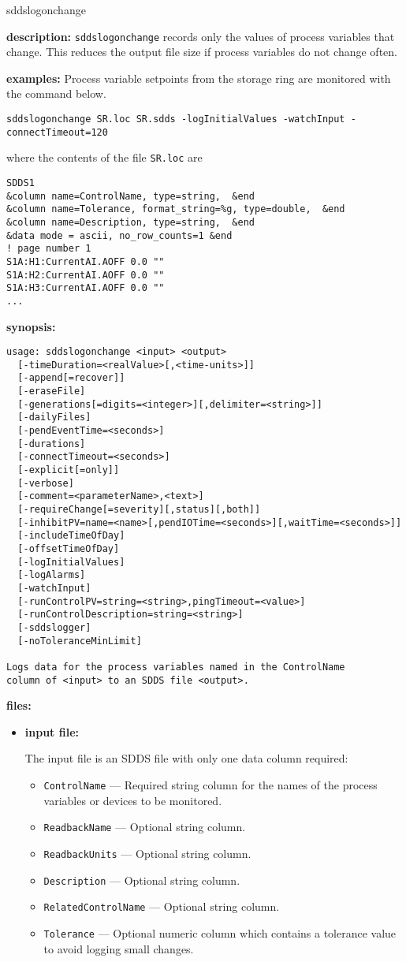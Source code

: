 \begin{sddsprog}{sddslogonchange}
\item \textbf{description:}
\verb+sddslogonchange+ records only the values of process variables that change. This reduces the output file size if process variables do not change often.
\item \textbf{examples:}
Process variable setpoints from the storage ring are monitored
with the command below.
\begin{verbatim}
sddslogonchange SR.loc SR.sdds -logInitialValues -watchInput -connectTimeout=120
\end{verbatim}
where the contents of the file \verb+SR.loc+ are
\begin{verbatim}
SDDS1
&column name=ControlName, type=string,  &end
&column name=Tolerance, format_string=%g, type=double,  &end
&column name=Description, type=string,  &end
&data mode = ascii, no_row_counts=1 &end
! page number 1
S1A:H1:CurrentAI.AOFF 0.0 ""
S1A:H2:CurrentAI.AOFF 0.0 ""
S1A:H3:CurrentAI.AOFF 0.0 ""
...
\end{verbatim}
\item \textbf{synopsis:}
\begin{verbatim}
usage: sddslogonchange <input> <output>
  [-timeDuration=<realValue>[,<time-units>]]
  [-append[=recover]]
  [-eraseFile]
  [-generations[=digits=<integer>][,delimiter=<string>]]
  [-dailyFiles]
  [-pendEventTime=<seconds>]
  [-durations]
  [-connectTimeout=<seconds>]
  [-explicit[=only]]
  [-verbose]
  [-comment=<parameterName>,<text>]
  [-requireChange[=severity][,status][,both]]
  [-inhibitPV=name=<name>[,pendIOTime=<seconds>][,waitTime=<seconds>]]
  [-includeTimeOfDay]
  [-offsetTimeOfDay]
  [-logInitialValues]
  [-logAlarms]
  [-watchInput]
  [-runControlPV=string=<string>,pingTimeout=<value>]
  [-runControlDescription=string=<string>]
  [-sddslogger]
  [-noToleranceMinLimit]

Logs data for the process variables named in the ControlName
column of <input> to an SDDS file <output>.
\end{verbatim}
\item \textbf{files:}
\begin{itemize}
  \item \textbf{input file:}\par
The input file is an SDDS file with only one data column required:
  \begin{itemize}
    \item {\tt ControlName} --- Required string column for the names of the process variables or devices to be monitored.
    \item {\tt ReadbackName} --- Optional string column.
    \item {\tt ReadbackUnits} --- Optional string column.
    \item {\tt Description} --- Optional string column.
    \item {\tt RelatedControlName} --- Optional string column.
    \item {\tt Tolerance} --- Optional numeric column which contains a tolerance value to avoid logging small changes.
  \end{itemize}


\end{itemize}
\end{sddsprog}

